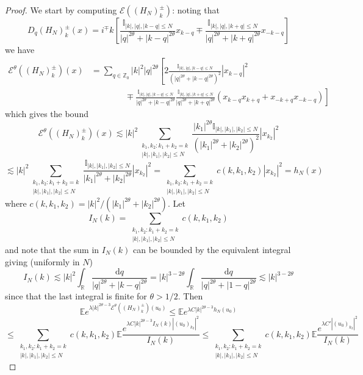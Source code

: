 \documentclass[11pt,a4paper,draft,reqno]{amsart}
\newcommand{\II}{\mathbb{I}}
\newcommand{\RR}{\mathbb{R}}
\newcommand{\ZZ}{\mathbb{Z}}
\newcommand{\expect}{\mathbb{E}}
\newcommand{\cE}{\mathcal{E}}
\newcommand{\dd}{\mathrm{d}}
\begin{document}
\begin{proof}
We start by computing $\cE((H_N)^\pm_k)$: noting that
$$
D_q (H_{N})^\pm_k(x)=  i^\mp k  \left[  \frac{\II_{|k|,|q|,|k-q|\le N}}{|q|^{2\theta}+|k-q|^{2\theta}}  x_{k-q}\mp \frac{\II_{|k|,|q|,|k+q|\le N}}{|q|^{2\theta}+|k+q|^{2\theta}}  x_{-k-q}\right]
$$ 
we have
\begin{equation*}
\begin{split}
 \cE^\theta((H_N)^\pm_k)(x) & = \sum_{q\in\ZZ_0} |k|^2 |q|^{2\theta}\left[
 2 \frac{\II_{|k|,|q|,|k-q|\le N}}{(|q|^{2\theta}+|k-q|^{2\theta})^2}  |x_{k-q}|^2
 \right . \\
  & \left .
 \qquad \qquad \mp \frac{\II_{|k|,|q|,|k-q|\le N}}{|q|^{2\theta}+|k-q|^{2\theta}}  \frac{\II_{|k|,|q|,|k+q|\le N}}{|q|^{2\theta}+|k+q|^{2\theta}}  (x_{k-q} x_{k+q}+x_{-k+q} x_{-k-q})
 \right]
\end{split}
\end{equation*}
which gives the bound
$$
 \cE^\theta((H_N)^\pm_k)(x)\lesssim   |k|^2  \sum_{\substack{k_1,k_2 :k_1+k_2=k\\|k|,|k_1|,|k_2|\le N}} \frac{|k_1|^{2\theta}\II_{|k|,|k_1|,|k_2|\le N}}{(|k_1|^{2\theta}+|k_2|^{2\theta})^2}  |x_{k_2}|^2 
$$
$$
\lesssim  |k|^2  \sum_{\substack{k_1,k_2 :k_1+k_2=k\\|k|,|k_1|,|k_2|\le N}} \frac{\II_{|k|,|k_1|,|k_2|\le N}}{|k_1|^{2\theta}+|k_2|^{2\theta}}  |x_{k_2}|^2 =   \sum_{\substack{k_1,k_2 :k_1+k_2=k\\|k|,|k_1|,|k_2|\le N}}c(k,k_1,k_2) |x_{k_2}|^2  = h_N(x)
$$
where $c(k,k_1,k_2) = |k|^2/(|k_1|^{2\theta}+|k_2|^{2\theta})$.
Let $$
I_N(k) =  \sum_{\substack{k_1,k_2 :k_1+k_2=k\\|k|,|k_1|,|k_2|\le N}}  c(k,k_1,k_2) 
$$
and note that the sum in $I_N(k)$ can be bounded by the equivalent integral giving (uniformly in $N$)
$$
I_N(k) \lesssim  |k|^{2}  \int_{\RR} \frac{\dd q}{|q|^{2\theta}+|k-q|^{2\theta}} 
= |k|^{3-2\theta}  \int_{\RR} \frac{\dd q}{|q|^{2\theta}+|1-q|^{2\theta}} \lesssim |k|^{3-2\theta} 
$$
since that the last integral is finite for $\theta > 1/2$. Then
$$
\expect e^{\lambda |k|^{2\theta-3}\cE^\theta((H_N)^\pm_k)(u_0)} \le \expect e^{\lambda C|k|^{2\theta-3} h_N(u_0)}
$$
$$
 \le \sum_{\substack{k_1,k_2 :k_1+k_2=k\\|k|,|k_1|,|k_2|\le N}} c(k,k_1,k_2)  \expect \frac{e^{\lambda C |k|^{2\theta-3} I_N(k) |(u_0)_{k_2}|^2}}{I_N(k)}
\le \sum_{\substack{k_1,k_2 :k_1+k_2=k\\|k|,|k_1|,|k_2|\le N}} c(k,k_1,k_2)  \expect \frac{e^{\lambda C'|(u_0)_{k_2}|^2}}{I_N(k)} 
$$
\end{proof}
\end{document}
